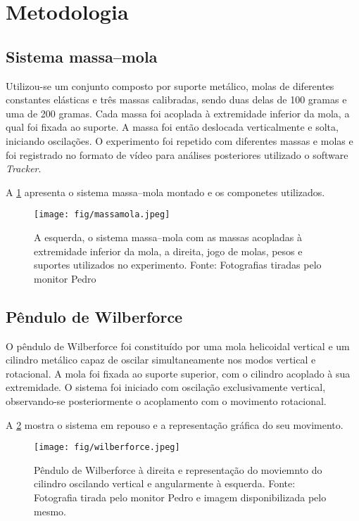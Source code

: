 \section{Metodologia}

\subsection{Sistema massa–mola}

Utilizou-se um conjunto composto por suporte metálico, molas de diferentes constantes elásticas e três massas calibradas, sendo duas delas de 100 gramas e uma de 200 gramas. Cada massa foi acoplada à extremidade inferior da mola, a qual foi fixada ao suporte. A massa foi então deslocada verticalmente e solta, iniciando oscilações. O experimento foi repetido com diferentes massas e molas e foi registrado no formato de vídeo para análises posteriores utilizado o software \textit{Tracker}.

A \cref{fig:massamola} apresenta o sistema massa–mola montado e os componetes utilizados.

\begin{figure}[H]
    \centering
    \texttt{[image: fig/massamola.jpeg]}
    \caption{A esquerda, o sistema massa–mola com as massas acopladas à extremidade inferior da mola, a direita, jogo de molas, pesos e suportes utilizados no experimento. Fonte: Fotografias tiradas pelo monitor Pedro}
    \label{fig:massamola}
\end{figure}

\subsection{Pêndulo de Wilberforce}

O pêndulo de Wilberforce foi constituído por uma mola helicoidal vertical e um cilindro metálico capaz de oscilar simultaneamente nos modos vertical e rotacional. A mola foi fixada ao suporte superior, com o cilindro acoplado à sua extremidade. O sistema foi iniciado com oscilação exclusivamente vertical, observando-se posteriormente o acoplamento com o movimento rotacional.

A \cref{fig:wilberforce} mostra o sistema em repouso e a representação gráfica do seu movimento.

\begin{figure}[H]
    \centering
    \texttt{[image: fig/wilberforce.jpeg]}
    \caption{Pêndulo de Wilberforce à direita e representação do moviemnto do cilindro oscilando vertical e angularmente à esquerda. Fonte: Fotografia tirada pelo monitor Pedro e imagem disponibilizada pelo mesmo.}
    \label{fig:wilberforce}
\end{figure}


